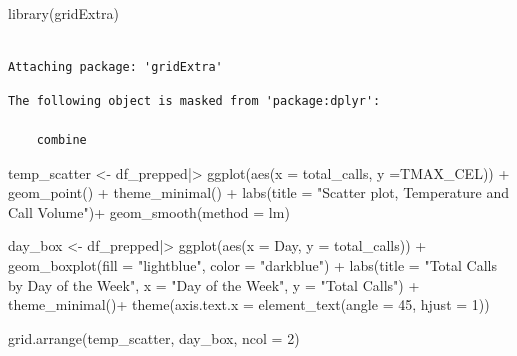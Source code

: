 \documentclass[
  letterpaper,
  DIV=11,
  numbers=noendperiod]{scrartcl}
\newenvironment{Shaded}{\begin{snugshade}}{\end{snugshade}}
\newcommand{\AttributeTok}[1]{\textcolor[rgb]{0.40,0.45,0.13}{#1}}
\newcommand{\DecValTok}[1]{\textcolor[rgb]{0.68,0.00,0.00}{#1}}
\newcommand{\FunctionTok}[1]{\textcolor[rgb]{0.28,0.35,0.67}{#1}}
\newcommand{\NormalTok}[1]{\textcolor[rgb]{0.00,0.23,0.31}{#1}}
\newcommand{\OtherTok}[1]{\textcolor[rgb]{0.00,0.23,0.31}{#1}}
\newcommand{\SpecialCharTok}[1]{\textcolor[rgb]{0.37,0.37,0.37}{#1}}
\newcommand{\StringTok}[1]{\textcolor[rgb]{0.13,0.47,0.30}{#1}}
\begin{document}
\begin{Shaded}
\begin{Highlighting}[]
\FunctionTok{library}\NormalTok{(gridExtra)}
\end{Highlighting}
\end{Shaded}

\begin{verbatim}

Attaching package: 'gridExtra'
\end{verbatim}

\begin{verbatim}
The following object is masked from 'package:dplyr':

    combine
\end{verbatim}

\begin{Shaded}
\begin{Highlighting}[]
\NormalTok{temp\_scatter }\OtherTok{\textless{}{-}}\NormalTok{ df\_prepped}\SpecialCharTok{|\textgreater{}}
  \FunctionTok{ggplot}\NormalTok{(}\FunctionTok{aes}\NormalTok{(}\AttributeTok{x =}\NormalTok{ total\_calls, }\AttributeTok{y =}\NormalTok{TMAX\_CEL)) }\SpecialCharTok{+} 
  \FunctionTok{geom\_point}\NormalTok{() }\SpecialCharTok{+} 
  \FunctionTok{theme\_minimal}\NormalTok{() }\SpecialCharTok{+} 
  \FunctionTok{labs}\NormalTok{(}\AttributeTok{title =} \StringTok{"Scatter plot, Temperature and Call Volume"}\NormalTok{)}\SpecialCharTok{+} 
  \FunctionTok{geom\_smooth}\NormalTok{(}\AttributeTok{method =}\NormalTok{ lm)}

\NormalTok{day\_box }\OtherTok{\textless{}{-}}\NormalTok{ df\_prepped}\SpecialCharTok{|\textgreater{}}
  \FunctionTok{ggplot}\NormalTok{(}\FunctionTok{aes}\NormalTok{(}\AttributeTok{x =}\NormalTok{ Day, }\AttributeTok{y =}\NormalTok{ total\_calls)) }\SpecialCharTok{+}
  \FunctionTok{geom\_boxplot}\NormalTok{(}\AttributeTok{fill =} \StringTok{"lightblue"}\NormalTok{, }\AttributeTok{color =} \StringTok{"darkblue"}\NormalTok{) }\SpecialCharTok{+}
  \FunctionTok{labs}\NormalTok{(}\AttributeTok{title =} \StringTok{"Total Calls by Day of the Week"}\NormalTok{, }\AttributeTok{x =} \StringTok{"Day of the Week"}\NormalTok{, }\AttributeTok{y =} \StringTok{"Total Calls"}\NormalTok{) }\SpecialCharTok{+}
  \FunctionTok{theme\_minimal}\NormalTok{()}\SpecialCharTok{+} 
  \FunctionTok{theme}\NormalTok{(}\AttributeTok{axis.text.x =} \FunctionTok{element\_text}\NormalTok{(}\AttributeTok{angle =} \DecValTok{45}\NormalTok{, }\AttributeTok{hjust =} \DecValTok{1}\NormalTok{))}

\FunctionTok{grid.arrange}\NormalTok{(temp\_scatter, day\_box, }\AttributeTok{ncol =} \DecValTok{2}\NormalTok{) }
\end{Highlighting}
\end{Shaded}
\end{document}
